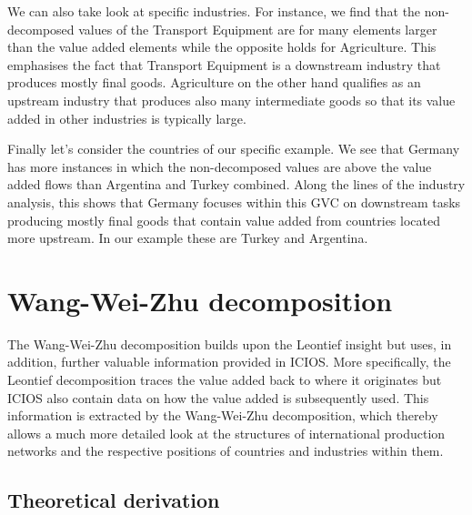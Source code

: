 \documentclass[a4paper]{article}\usepackage[]{graphicx}\usepackage[]{color}
\begin{document}
We can also take look at specific industries.
For instance, we find that the non-decomposed values of the Transport Equipment are for many elements larger than the value added elements while the opposite holds for Agriculture.
This emphasises the fact that Transport Equipment is a downstream industry that produces mostly final goods.
Agriculture on the other hand qualifies as an upstream industry that produces also many intermediate goods so that its value added in other industries is typically large.

Finally let's consider the countries of our specific example.
We see that Germany has more instances in which the non-decomposed values are above the value added flows than Argentina and Turkey combined.
Along the lines of the industry analysis, this shows that Germany focuses within this GVC on downstream tasks producing mostly final goods that contain value added from countries located more upstream.
In our example these are Turkey and Argentina.


\section{Wang-Wei-Zhu decomposition}
\label{sec:wwz}
The Wang-Wei-Zhu decomposition builds upon the Leontief insight but uses, in addition, further valuable information
provided in ICIOS.
More specifically, the Leontief decomposition traces the value added back to where it originates but ICIOS also contain data on how the value added is subsequently used.
This information is extracted by the Wang-Wei-Zhu decomposition, which thereby allows a much more detailed look at the structures of international production networks and the respective positions of countries and industries within them.

\subsection{Theoretical derivation}
\end{document}
